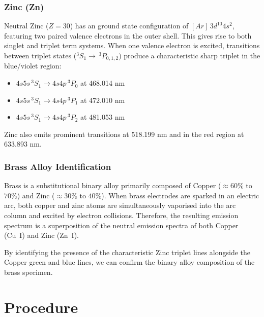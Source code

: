 \documentclass[12pt, a4paper]{article}
\begin{document}
\subsubsection{Zinc (Zn)}
Neutral Zinc ($Z = 30$) has an ground state configuration of $[Ar]\, 3d^{10} 4s^2$, featuring two paired valence electrons in the outer shell. This gives rise to both singlet and triplet term systems. When one valence electron is excited, transitions between triplet states ($^3S_1 \rightarrow \,^3P_{0,1,2}$) produce a characteristic sharp triplet in the blue/violet region:
\begin{itemize}
    \item $4s 5s\,^3S_1 \rightarrow 4s 4p\,^3P_0$ at 468.014 nm
    \item $4s 5s\,^3S_1 \rightarrow 4s 4p\,^3P_1$ at 472.010 nm
    \item $4s 5s\,^3S_1 \rightarrow 4s 4p\,^3P_2$ at 481.053 nm
\end{itemize}
Zinc also emits prominent transitions at 518.199 nm and in the red region at 633.893 nm.

\subsubsection{Brass Alloy Identification}
Brass is a substitutional binary alloy primarily composed of Copper ($\approx 60\%$ to $70\%$) and Zinc ($\approx 30\%$ to $40\%$). When brass electrodes are sparked in an electric arc, both copper and zinc atoms are simultaneously vaporised into the arc column and excited by electron collisions. Therefore, the resulting emission spectrum is a superposition of the neutral emission spectra of both Copper (Cu~I) and Zinc (Zn~I). 

By identifying the presence of the characteristic Zinc triplet lines alongside the Copper green and blue lines, we can confirm the binary alloy composition of the brass specimen.

\section{Procedure}
\end{document}
